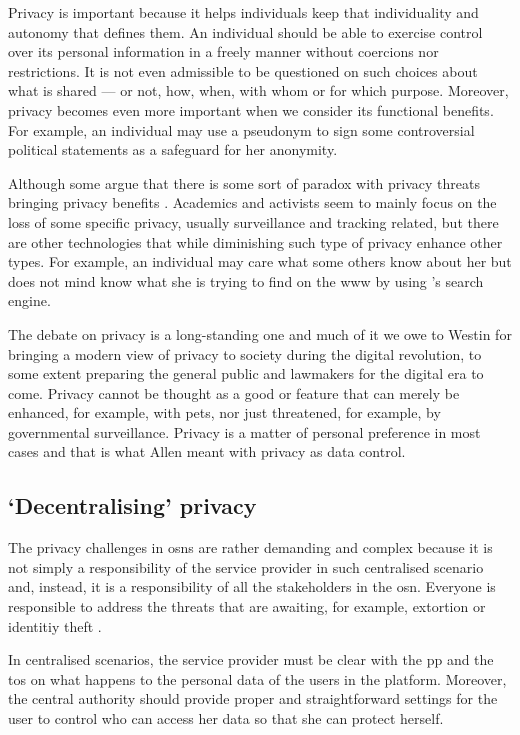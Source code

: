\documentclass[showtrims,oldfontcommands]{kthesis}
\begin{document}
Privacy is important because it helps individuals keep that individuality and autonomy 
that defines them. An individual should be able to exercise control over its personal 
information in a freely manner without coercions nor restrictions. It is not even 
admissible to be questioned on such choices about what is shared --- or not, how, 
when, with whom or for which purpose. Moreover, privacy becomes even more important 
when we consider its functional benefits. For example, an individual may use a pseudonym 
to sign some controversial political statements as a safeguard for her anonymity.

Although some argue that there is some sort of paradox with privacy threats bringing 
privacy benefits \cite{WittesL15}. Academics and activists seem to mainly focus 
on the loss of some specific privacy, usually surveillance and tracking related, 
but there are other technologies that while diminishing such type of privacy enhance 
other types. For example, an individual may care what some others know about her 
but does not mind \Google know what she is trying to find on the \ac{www} by using 
\Google's search engine.

The debate on privacy is a long-standing one and much of it we owe to Westin for 
bringing a modern view of privacy to society during the digital revolution, to some 
extent preparing the general public and lawmakers for the digital era to come. Privacy 
cannot be thought as a good or feature that can merely be enhanced, for example, 
with \acp{pet}, nor just threatened, for example, by governmental surveillance. 
Privacy is a matter of personal preference in most cases and that is what Allen 
meant with privacy as data control.

\subsection{`Decentralising' privacy}
    \label{subsection:decentralising-privacy}
The privacy challenges in \acp{osn} are rather demanding and complex because it is 
not simply a responsibility of the service provider in such centralised scenario 
and, instead, it is a responsibility of all the stakeholders in the \ac{osn}. Everyone  
is responsible to address the threats that are awaiting, for example, extortion 
or identitiy theft \cite{GrossAH05}. 

In centralised scenarios, the service provider must be clear with the \ac{pp} and 
the \ac{tos} on what happens to the personal data of the users in the platform. 
Moreover, the central authority should provide proper and straightforward settings 
for the user to control who can access her data so that she can protect herself. 
\end{document}
